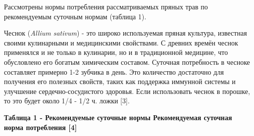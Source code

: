\begin{multicols}{2}
Рассмотрены нормы потребления рассматриваемых пряных трав по
рекомендуемым суточным нормам (таблица 1).

Чеснок (\emph{Allium sativum}) - это широко используемая пряная
культура, известная своими кулинарными и медицинскими свойствами. С
древних времён чеснок применялся и не только в кулинарии, но и в
традиционной медицине, что обусловлено его богатым химическим составом.
Суточная потребность в чесноке составляет примерно 1-2 зубчика в день.
Это количество достаточно для получения его полезных свойств, таких как
поддержка иммунной системы и улучшение сердечно-сосудистого здоровья.
Если использовать чеснок в порошке, то это будет около 1/4 - 1/2 ч.
ложки {[}3{]}.
\end{multicols}

{\bfseries Таблица 1 - Рекомендуемые суточные нормы Рекомендуемая суточная норма потребления {[}4{]}}


